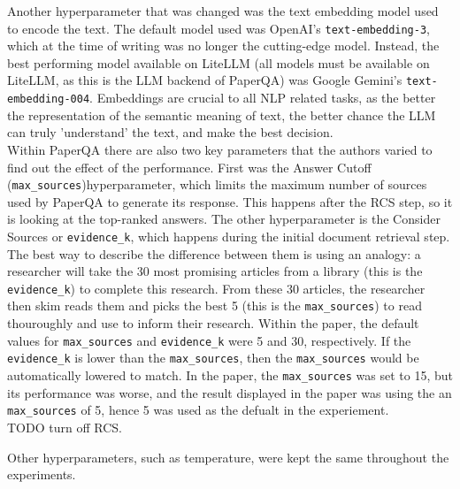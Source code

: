 Another hyperparameter that was changed was the text embedding model used to encode the text. The default model used was OpenAI's \texttt{text-embedding-3}, which at the time of writing was no longer the cutting-edge model. Instead, the best performing model available on LiteLLM (all models must be available on LiteLLM, as this is the LLM backend of PaperQA) was Google Gemini's \texttt{text-embedding-004}. Embeddings are crucial to all NLP related tasks, as the better the representation of the semantic meaning of text, the better chance the LLM can truly 'understand' the text, and make the best decision. \\

Within PaperQA there are also two key parameters that the authors varied to find out the effect of the performance. First was the Answer Cutoff (\texttt{max\_sources})hyperparameter, which limits the maximum number of sources used by PaperQA to generate its response. This happens after the RCS step, so it is looking at the top-ranked answers. The other hyperparameter is the Consider Sources or \texttt{evidence\_k}, which happens during the initial document retrieval step. The best way to describe the difference between them is using an analogy: a researcher will take the 30 most promising articles from a library (this is the \texttt{evidence\_k}) to complete this research. From these 30 articles, the researcher then skim reads them and picks the best 5 (this is the \texttt{max\_sources}) to read thouroughly and use to inform their research. Within the paper, the default values for \texttt{max\_sources} and \texttt{evidence\_k} were 5 and 30, respectively. If the \texttt{evidence\_k} is lower than the \texttt{max\_sources}, then the \texttt{max\_sources} would be automatically lowered to match. 
In the paper, the \texttt{max\_sources} was set to 15, but its performance was worse, and the result displayed in the paper was using the an \texttt{max\_sources} of 5, hence 5 was used as the defualt in the experiement.\\

TODO turn off RCS. 

Other hyperparameters, such as temperature, were kept the same throughout the experiments. \\


